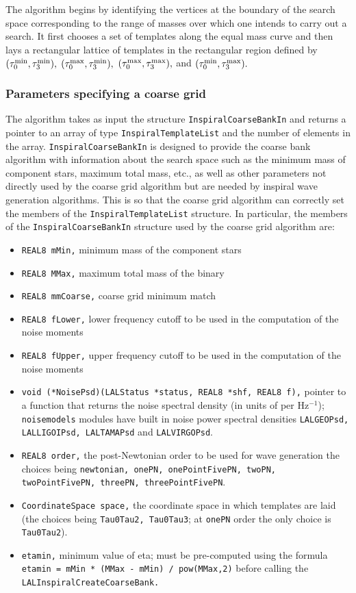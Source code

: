 The algorithm begins by identifying the vertices at the boundary of
the search space corresponding to the range of masses over which one
intends to carry out a search. It first chooses a set of templates
along the equal mass curve and then lays a rectangular lattice
of templates in the rectangular region defined by
$(\tau_0^{\rm min}, \tau_3^{\rm min}),$ $(\tau_0^{\rm max}, \tau_3^{\rm min}),$
$(\tau_0^{\rm max}, \tau_3^{\rm max}),$ and $(\tau_0^{\rm min}, \tau_3^{\rm max}).$

\subsubsection{Parameters specifying a coarse grid}

The algorithm takes as input the structure
\texttt {InspiralCoarseBankIn} and returns a pointer to an array of
type \texttt{InspiralTemplateList} and the number of elements in the
array.  \texttt{InspiralCoarseBankIn} is designed to provide the coarse
bank algorithm with information about the search space such as the
minimum mass of component stars, maximum total mass, etc., as well as
other parameters not directly used by the coarse grid algorithm but
are needed by inspiral wave generation algorithms. This is so that
the coarse grid algorithm can correctly set the members of the
\texttt{InspiralTemplateList} structure. In particular, the members
of the \texttt{InspiralCoarseBankIn} structure used by the coarse grid
algorithm are:
\begin{itemize}
\item \texttt {REAL8 mMin,} minimum mass of the component stars
\item \texttt {REAL8 MMax,} maximum total mass of the binary
\item \texttt {REAL8 mmCoarse,} coarse grid minimum match
\item \texttt {REAL8 fLower,} lower frequency cutoff to be used in the computation of the
noise moments
\item \texttt {REAL8 fUpper,} upper frequency cutoff to be used in the computation of the
noise moments
\item \texttt {void (*NoisePsd)(LALStatus *status, REAL8 *shf, REAL8 f),} pointer to
a function that returns the noise spectral density (in units of per Hz$^{-1}$);
\texttt{noisemodels} modules have built in noise power spectral densities
\texttt{LALGEOPsd, LALLIGOIPsd, LALTAMAPsd} and \texttt{LALVIRGOPsd}.
\item \texttt {REAL8 order,} the post-Newtonian order to be used
for wave generation the choices being
\texttt {newtonian, onePN, onePointFivePN, twoPN, twoPointFivePN,
threePN, threePointFivePN}.
\item \texttt {CoordinateSpace space,} the coordinate space in which templates
are laid (the choices being \texttt {Tau0Tau2, Tau0Tau3}; at \texttt{onePN}
order the only choice is \texttt{Tau0Tau2}).
\item \texttt {etamin,} minimum value of eta; must be pre-computed using the
formula \texttt{etamin = mMin * (MMax - mMin) / pow(MMax,2)}
before calling the \texttt {LALInspiralCreateCoarseBank.}
\end{itemize}
